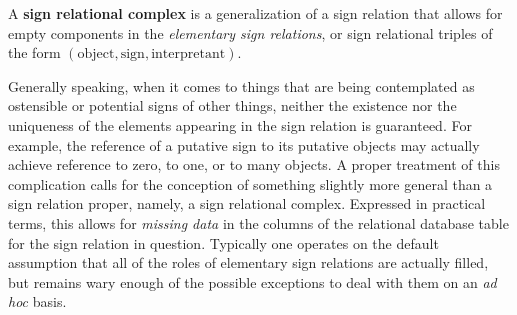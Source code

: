 \documentclass[12pt]{article}
\begin{document}

A \textbf{sign relational complex} is a generalization of a sign relation that allows for empty components in the \textit{elementary sign relations}, or sign relational triples of the form $(\mathrm{object}, \mathrm{sign}, \mathrm{interpretant})$.

Generally speaking, when it comes to things that are being contemplated as ostensible or potential signs of other things, neither the existence nor the uniqueness of the elements appearing in the sign relation is guaranteed.  For example, the reference of a putative sign to its putative objects may actually achieve reference to zero, to one, or to many objects.  A proper treatment of this complication calls for the conception of something slightly more general than a sign relation proper, namely, a sign relational complex.  Expressed in practical terms, this allows for \textit{missing data} in the columns of the relational database table for the sign relation in question.  Typically one operates on the default assumption that all of the roles of elementary sign relations are actually filled, but remains wary enough of the possible exceptions to deal with them on an \textit{ad hoc} basis.

\end{document}
